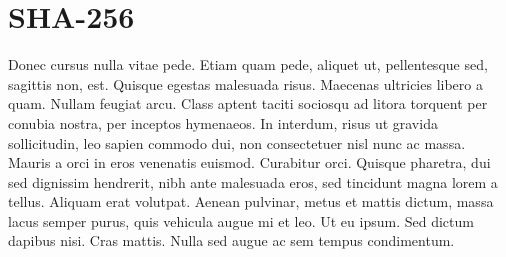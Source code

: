\documentclass[oneside]{mgr}
\begin{document}
\chapter{SHA-256}
Donec cursus nulla vitae pede. Etiam quam pede, aliquet ut,
pellentesque sed, sagittis non, est. Quisque egestas malesuada
risus. Maecenas ultricies libero a quam. Nullam feugiat arcu. Class
aptent taciti sociosqu ad litora torquent per conubia nostra, per
inceptos hymenaeos. In interdum, risus ut gravida sollicitudin, leo
sapien commodo dui, non consectetuer nisl nunc ac massa. Mauris a orci
in eros venenatis euismod. Curabitur orci. Quisque pharetra, dui sed
dignissim hendrerit, nibh ante malesuada eros, sed tincidunt magna
lorem a tellus. Aliquam erat volutpat. Aenean pulvinar, metus et
mattis dictum, massa lacus semper purus, quis vehicula augue mi et
leo. Ut eu ipsum. Sed dictum dapibus nisi. Cras mattis. Nulla sed
augue ac sem tempus condimentum.




\end{document}

